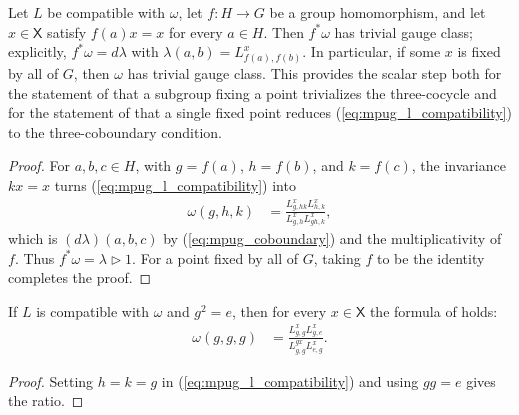 \begin{lemma}
    \label{thm:mpug_fixed_block_trivializes}
    \leanok
    Let $L$ be compatible with $\omega$, let $f\colon H\to G$ be a group
    homomorphism, and let $x\in\mathsf X$ satisfy $f(a)x=x$ for every
    $a\in H$. Then $f^*\omega$ has trivial gauge class; explicitly,
    $f^*\omega=d\lambda$ with $\lambda(a,b)=L^x_{f(a),f(b)}$. In particular,
    if some $x$ is fixed by all of $G$, then $\omega$ has trivial gauge class.
    This provides the scalar step both for the statement of
    \cite[lines~740--745]{GarreRubio2023MPOSym} that a subgroup fixing a point
    trivializes the three-cocycle and for the statement of
    \cite[line~1925]{FrancoRubio2025MPUGauging} that a single fixed point
    reduces (\ref{eq:mpug_l_compatibility}) to the three-coboundary condition.
\end{lemma}
\begin{proof}\leanok
    For $a,b,c\in H$, with $g=f(a)$, $h=f(b)$, and $k=f(c)$, the invariance
    $kx=x$ turns (\ref{eq:mpug_l_compatibility}) into
    \begin{align}
        \omega(g,h,k)
         & =\frac{L^x_{g,hk}L^x_{h,k}}{L^x_{g,h}L^x_{gh,k}},
    \end{align}
    which is $(d\lambda)(a,b,c)$ by (\ref{eq:mpug_coboundary}) and the
    multiplicativity of $f$. Thus
    $f^*\omega=\lambda\mathbin{\triangleright}1$. For a point fixed by all
    of $G$, taking $f$ to be the identity completes the proof.
\end{proof}

\begin{lemma}
    \label{thm:mpug_involution_anomaly_ratio}
    \leanok
    If $L$ is compatible with $\omega$ and $g^2=e$, then for every
    $x\in\mathsf X$ the formula of
    \cite[line~5121]{FrancoRubio2025MPUGauging} holds:
    \begin{align}
        \omega(g,g,g)
         & =\frac{L^x_{g,g}L^x_{g,e}}{L^{gx}_{g,g}L^x_{e,g}}.
    \end{align}
\end{lemma}
\begin{proof}\leanok
    Setting $h=k=g$ in (\ref{eq:mpug_l_compatibility}) and using $gg=e$
    gives the ratio.
\end{proof}

